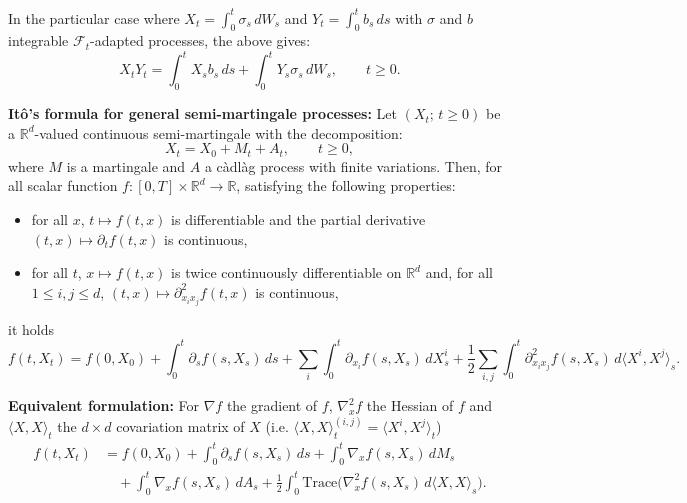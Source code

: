 \documentclass[11pt]{article}
\begin{document}
In the particular case where $X_t=\int_0^t \sigma_s\,dW_s$ and $Y_t=\int_0^t b_s\,ds$ with $\sigma$ and $b$ integrable $\mathcal{F}_t$-adapted processes, the above gives:
\[
X_tY_t=\int_0^t X_sb_s\,ds+\int_0^t Y_s\sigma_s\,dW_s,\qquad t\ge0.
\]

\noindent\textbf{It\^o's formula for general semi-martingale processes:}
Let $(X_t;\,t\ge0)$ be a $\mathbb{R}^d$-valued continuous semi-martingale with the decomposition:
\[
X_t=X_0+M_t+A_t,\qquad t\ge0,
\]
where $M$ is a martingale and $A$ a c\`adl\`ag process with finite variations. Then, for all scalar function
$f:[0,T]\times\mathbb{R}^d\to\mathbb{R}$, satisfying the following properties:
\begin{itemize}
\item for all $x$, $t\mapsto f(t,x)$ is differentiable and the partial derivative $(t,x)\mapsto \partial_t f(t,x)$ is continuous,
\item for all $t$, $x\mapsto f(t,x)$ is twice continuously differentiable on $\mathbb{R}^d$ and, for all $1\le i,j\le d$, $(t,x)\mapsto \partial_{x_i x_j}^2 f(t,x)$ is continuous,
\end{itemize}
it holds
\[
f(t,X_t)=f(0,X_0)+\int_0^t \partial_s f(s,X_s)\,ds+\sum_i\int_0^t \partial_{x_i}f(s,X_s)\,dX_s^i+\frac{1}{2}\sum_{i,j}\int_0^t \partial_{x_i x_j}^2 f(s,X_s)\,d\langle X^i,X^j\rangle_s.
\]

\noindent\textbf{Equivalent formulation:}
For $\nabla f$ the gradient of $f$, $\nabla_x^2f$ the Hessian of $f$ and $\langle X,X\rangle_t$ the $d\times d$ covariation matrix of $X$ (i.e. $\langle X,X\rangle_t^{(i,j)}=\langle X^i,X^j\rangle_t$)
\[
\begin{aligned}
f(t,X_t)
&=f(0,X_0)+\int_0^t \partial_s f(s,X_s)\,ds+\int_0^t \nabla_x f(s,X_s)\,dM_s \\
&\quad +\int_0^t \nabla_x f(s,X_s)\,dA_s+\frac{1}{2}\int_0^t \mathrm{Trace}\bigl(\nabla_x^2 f(s,X_s)\,d\langle X,X\rangle_s\bigr).
\end{aligned}
\]


\printbibliography
\end{document}
